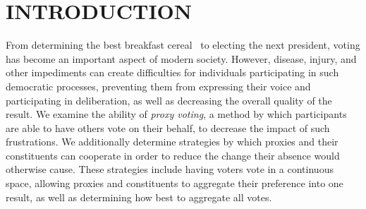 %
%

\chapter{INTRODUCTION}\label{ch:introduction}
\thispagestyle{empty}
From determining the best breakfast cereal~\cite{Curtis2021} to electing the next
president, voting has become an important aspect of modern society.
However, disease, injury, and other impediments can create difficulties for individuals
participating in such democratic processes, preventing them from expressing their
voice and participating in deliberation, as well as decreasing the overall quality of
the result.
We examine the ability of \textit{proxy voting}, a method by which participants are able
to have others vote on their behalf, to decrease the impact of such frustrations.
We additionally determine strategies by which proxies and their constituents can
cooperate in order to reduce the change their absence would otherwise cause.
These strategies include having voters vote in a continuous space, allowing proxies
and constituents to aggregate their preference into one result, as well as
determining how best to aggregate all votes.

